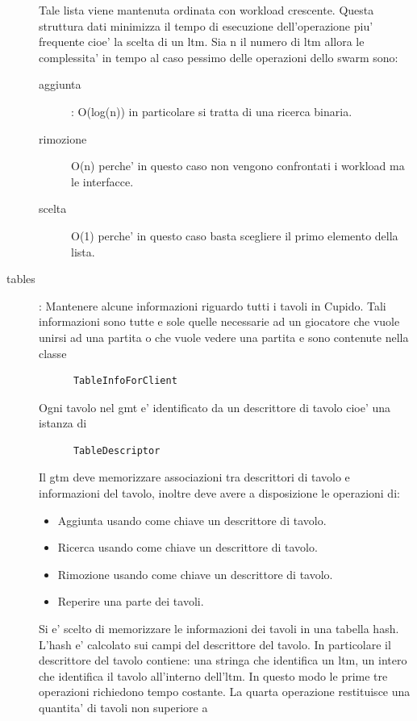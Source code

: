 \begin{description}
\begin{verbatim}
	\end{verbatim}
	Tale lista viene mantenuta ordinata con workload crescente. Questa struttura dati minimizza il tempo di esecuzione dell'operazione piu' frequente cioe' la scelta di un ltm.  Sia n il numero di ltm allora le complessita' in tempo al caso pessimo delle operazioni dello swarm sono:
	\begin{description}
	  \item[aggiunta]: 
	    O(log(n)) in particolare si tratta di una ricerca binaria.
	  \item[rimozione]
	    O(n) perche' in questo caso non vengono confrontati i workload ma le interfacce.
	  \item[scelta]
	    O(1) perche' in questo caso basta scegliere il primo elemento della lista.
	\end{description}
      \item[tables]:
	Mantenere alcune informazioni riguardo tutti i tavoli in Cupido. Tali informazioni sono tutte e sole quelle necessarie ad un giocatore che vuole unirsi ad una partita o che vuole vedere una partita e sono contenute nella classe 
	\begin{verbatim}
	  TableInfoForClient
	\end{verbatim}
	Ogni tavolo nel gmt e' identificato da un descrittore di tavolo cioe' una istanza di
	\begin{verbatim}
	  TableDescriptor
	\end{verbatim}
	Il gtm deve memorizzare associazioni tra descrittori di tavolo e informazioni del tavolo, inoltre deve avere a disposizione le operazioni di:
	\begin{itemize}
	  \item 
	    Aggiunta usando come chiave un descrittore di tavolo.
	  \item
	    Ricerca usando come chiave un descrittore di tavolo.
	  \item
	    Rimozione usando come chiave un descrittore di tavolo.
	  \item
	    Reperire una parte dei tavoli.
	\end{itemize}
	Si e' scelto di memorizzare le informazioni dei tavoli in una tabella hash. L'hash e' calcolato sui campi del descrittore del tavolo. In particolare il descrittore del tavolo contiene: una stringa che identifica un ltm, un intero che identifica il tavolo all'interno dell'ltm. In questo modo le prime tre operazioni richiedono tempo costante. La quarta operazione restituisce una quantita' di tavoli non superiore a
	\begin{verbatim}

\end{verbatim}
\end{description}
